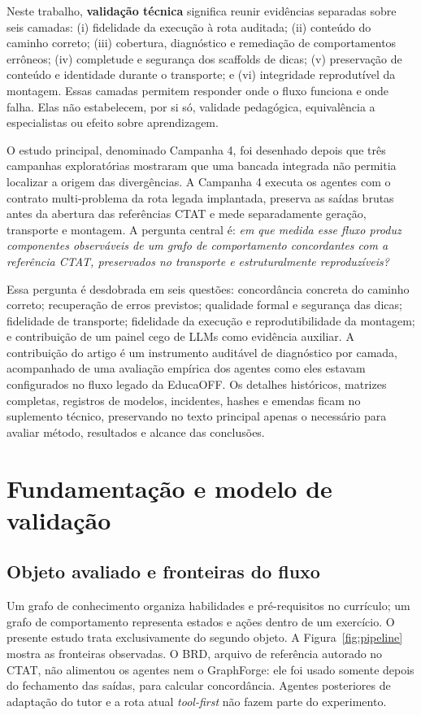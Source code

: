 \documentclass[11pt,a4paper]{article}
\begin{document}
Neste trabalho, \textbf{validação técnica} significa reunir evidências separadas sobre seis camadas: (i) fidelidade da execução à rota auditada; (ii) conteúdo do caminho correto; (iii) cobertura, diagnóstico e remediação de comportamentos errôneos; (iv) completude e segurança dos scaffolds de dicas; (v) preservação de conteúdo e identidade durante o transporte; e (vi) integridade reprodutível da montagem. Essas camadas permitem responder onde o fluxo funciona e onde falha. Elas não estabelecem, por si só, validade pedagógica, equivalência a especialistas ou efeito sobre aprendizagem.

O estudo principal, denominado Campanha 4, foi desenhado depois que três campanhas exploratórias mostraram que uma bancada integrada não permitia localizar a origem das divergências. A Campanha 4 executa os agentes com o contrato multi-problema da rota legada implantada, preserva as saídas brutas antes da abertura das referências CTAT e mede separadamente geração, transporte e montagem. A pergunta central é: \emph{em que medida esse fluxo produz componentes observáveis de um grafo de comportamento concordantes com a referência CTAT, preservados no transporte e estruturalmente reproduzíveis?}

Essa pergunta é desdobrada em seis questões: concordância concreta do caminho correto; recuperação de erros previstos; qualidade formal e segurança das dicas; fidelidade de transporte; fidelidade da execução e reprodutibilidade da montagem; e contribuição de um painel cego de LLMs como evidência auxiliar. A contribuição do artigo é um instrumento auditável de diagnóstico por camada, acompanhado de uma avaliação empírica dos agentes como eles estavam configurados no fluxo legado da EducaOFF. Os detalhes históricos, matrizes completas, registros de modelos, incidentes, hashes e emendas ficam no suplemento técnico, preservando no texto principal apenas o necessário para avaliar método, resultados e alcance das conclusões.

\section{Fundamentação e modelo de validação}

\subsection{Objeto avaliado e fronteiras do fluxo}

Um grafo de conhecimento organiza habilidades e pré-requisitos no currículo; um grafo de comportamento representa estados e ações dentro de um exercício. O presente estudo trata exclusivamente do segundo objeto. A Figura~\ref{fig:pipeline} mostra as fronteiras observadas. O BRD, arquivo de referência autorado no CTAT, não alimentou os agentes nem o GraphForge: ele foi usado somente depois do fechamento das saídas, para calcular concordância. Agentes posteriores de adaptação do tutor e a rota atual \emph{tool-first} não fazem parte do experimento.
\end{document}
